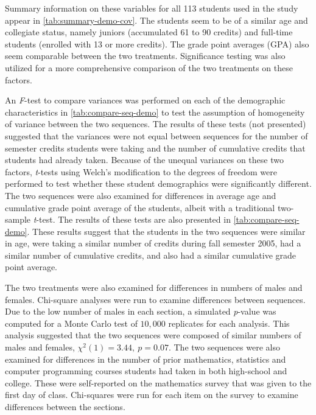 \documentclass[11pt]{umnthesis}
\begin{document}
Summary information on these variables for all 113 students used in the study appear in \ref{tab:summary-demo-cov}. The students seem to be of a similar age and collegiate status, namely juniors (accumulated 61 to 90 credits) and full-time students (enrolled with 13 or more credits). The grade point averages (GPA) also seem comparable between the two treatments. Significance testing was also utilized for a more comprehensive comparison of the two treatments on these factors.

An \emph{F}-test to compare variances was performed on each of the demographic characteristics in \ref{tab:compare-seq-demo} to test the assumption of homogeneity of variance between the two sequences. The results of these tests (not presented) suggested that the variances were not equal between sequences for the number of semester credits students were taking and the number of cumulative credits that students had already taken. Because of the unequal variances on these two factors, \emph{t}-tests using Welch's modification to the degrees of freedom were performed to test whether these student demographics were significantly different. The two sequences were also examined for differences in average age and cumulative grade point average of the students, albeit with a traditional two-sample \emph{t}-test. The results of these tests are also presented in \ref{tab:compare-seq-demo}. These results suggest that the students in the two sequences were similar in age, were taking a similar number of credits during fall semester 2005, had a similar number of cumulative credits, and also had a similar cumulative grade point average.

The two treatments were also examined for differences in numbers of males and females. Chi-square analyses were run to examine differences between sequences. Due to the low number of males in each section, a simulated \emph{p}-value was computed for a Monte Carlo test of \(10,000\) replicates for each analysis. This analysis suggested that the two sequences were composed of similar numbers of males and females, \(\chi^2(1) = 3.44,~ p = 0.07\). The two sequences were also examined for
differences in the number of prior mathematics, statistics and computer programming courses students had taken in both high-school and college. These were self-reported on the mathematics survey that was given to the first day of class. Chi-squares were run for each item on the survey to examine differences between the sections.
\end{document}
